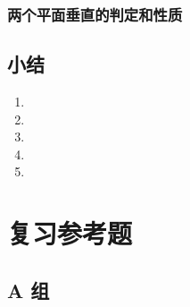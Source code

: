 \subsection{两个平面垂直的判定和性质}
\begin{Practice}
  \begin{question}
    \item 
    \item 
    \item 
  \end{question}
\end{Practice}
\begin{Exercise}
  \begin{question}
    \item 
    \item 
    \item 
    \item 
    \item 
    \item 
    \item 
    \item 
    \item 
    \item 
    \item 
    \item 
    \item 
  \end{question}
\end{Exercise}

\section*{小结}
\begin{enumerate}[C、,itemindent=4.5em]
  \item 
  \item 
  \item 
  \item 
  \item 
\end{enumerate}
\chapter*{复习参考题}
\section*{A 组}
\begin{question}
  \item 
  \item 
  \item 
  \item 
  \item 
  \item 
  \item 
  \item 
  \item 
  \item 
  \item 
  \item 
  \item 
  \item 
\end{question}
